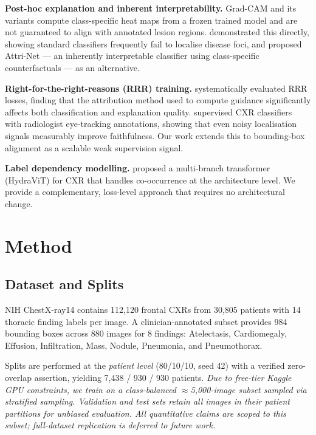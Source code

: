 \documentclass[10pt,twocolumn,letterpaper]{article}
\begin{document}
\noindent\textbf{Post-hoc explanation and inherent interpretability.}
Grad-CAM \citep{wang2017chestxray} and its variants compute class-specific heat maps
from a frozen trained model and are not guaranteed to align with annotated lesion
regions. \citet{attrinet2023} demonstrated this directly, showing standard classifiers
frequently fail to localise disease foci, and proposed Attri-Net --- an inherently
interpretable classifier using class-specific counterfactuals --- as an alternative.

\noindent\textbf{Right-for-the-right-reasons (RRR) training.}
\citet{rao2023} systematically evaluated RRR losses, finding that the attribution
method used to compute guidance significantly affects both classification and
explanation quality. \citet{lanfredi2023} supervised CXR classifiers with radiologist
eye-tracking annotations, showing that even noisy localisation signals measurably
improve faithfulness. Our work extends this to bounding-box alignment as a scalable
weak supervision signal.

\noindent\textbf{Label dependency modelling.}
\citet{hydravit2024} proposed a multi-branch transformer (HydraViT) for CXR that
handles co-occurrence at the architecture level. We provide a complementary,
loss-level approach that requires no architectural change.

\section{Method}

\subsection{Dataset and Splits}

NIH ChestX-ray14 \citep{wang2017chestxray} contains 112,120 frontal CXRs from 30,805
patients with 14 thoracic finding labels per image. A clinician-annotated subset
provides 984 bounding boxes across 880 images for 8 findings: Atelectasis,
Cardiomegaly, Effusion, Infiltration, Mass, Nodule, Pneumonia, and Pneumothorax.

Splits are performed at the \emph{patient level} (80/10/10, seed 42) with a verified
zero-overlap assertion, yielding 7,438 / 930 / 930 patients. \emph{Due to free-tier
Kaggle GPU constraints, we train on a class-balanced $\approx$5,000-image subset
sampled via stratified sampling. Validation and test sets retain all images in their
patient partitions for unbiased evaluation. All quantitative claims are scoped to this
subset; full-dataset replication is deferred to future work.}
\end{document}
